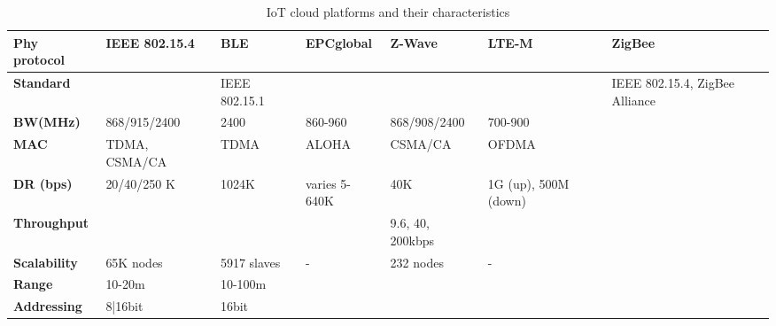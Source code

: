 \begin{table}[h!]
\scriptsize
	\begin{tabulary}{\textwidth}{L|L|L|L|L|L|L}
	\bf{Phy protocol}     & \bf{IEEE 802.15.4} & \bf{BLE}      & \bf{EPCglobal} & \bf{Z-Wave}              & \bf{LTE-M}           & \bf{ZigBee} \\\hline
	\bf{Standard}    &                    & IEEE 802.15.1 &                &                          &                      & IEEE 802.15.4, ZigBee Alliance \\\hline
	\bf{\ac{BW}(MHz)} & 868/915/2400       & 2400          & 860-960        & 868/908/2400             & 700-900              & \\\hline
	\bf{MAC}      & TDMA, CSMA/CA      & TDMA          & ALOHA          & CSMA/CA                  & OFDMA                & \\\hline
	\bf{\ac{DR} (bps)}  & 20/40/250 K        & 1024K         & varies 5-640K  & 40K                      & 1G (up), 500M (down) & \\\hline
	\bf{Throughput}       &                    &               &                & 9.6, 40, 200kbps         &                      & \\\hline
	\bf{Scalability}  & 65K nodes          & 5917 slaves   & -              & 232 nodes                & -                    & \\\hline
	\bf{Range}            & 10-20m             & 10-100m       &                &                          &                      & \\\hline
	\bf{Addressing}       & 8|16bit            & 16bit         &                &                          &                      & \\\hline
	\end{tabulary}
	\caption{\label{tab:IoT_cloud} IoT cloud platforms and their characteristics \cite{al-fuqaha_internet_24}}
\end{table}


